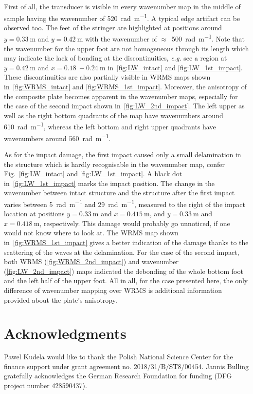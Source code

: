 \documentclass[times,final]{elsarticle}
\begin{document}
First of all, the transducer is visible in every wavenumber map in the middle of sample having the wavenumber of \SI{520}{\radian\per\meter}. A typical edge artifact can be observed too. The feet of the stringer are highlighted at positions around $y=\SI{0.33}{\meter}$ and $y=\SI{0.42}{\meter}$ with the wavenumber of $\approx$~\SI{500}{\radian\per\meter}. Note that the wavenumber for the upper foot are not homogeneous through its length which may indicate the lack of bonding at the discontinuities, \textit{e.g.} see a region at $y=\SI{0.42}{\meter}$ and $x=\SI{0.18}{}-\SI{0.24}{\meter}$ in~\autoref{fig:LW_intact} and \ref{fig:LW_1st_impact}. These discontinuities are also partially visible in WRMS maps shown in~\autoref{fig:WRMS_intact} and \ref{fig:WRMS_1st_impact}. Moreover, the anisotropy of the composite plate becomes apparent in the wavenumber maps, especially for the case of the second impact shown in~\autoref{fig:LW_2nd_impact}. The left upper as well as the right bottom quadrants of the map have wavenumbers around \SI{610}{\radian\per\meter}, whereas the left bottom and right upper quadrants have wavenumbers around \SI{560}{\radian\per\meter}.    

As for the impact damage, the first impact caused only a small delamination in the structure which is hardly recognisable in the wavenumber map, confer Fig.~\autoref{fig:LW_intact} and \ref{fig:LW_1st_impact}. A black dot in~\autoref{fig:LW_1st_impact} marks the impact position. The change in the wavenumber between intact structure and the structure after the first impact varies between \SI{5}{\radian\per\meter} and \SI{29}{\radian\per\meter}, measured to the right of the impact location at positions $y=\SI{0.33}{\meter}$ and $x=\SI{0.415}{\meter}$, and $y=\SI{0.33}{\meter}$ and $x=\SI{0.418}{\meter}$, respectively. This damage would probably go unnoticed, if one would not know where to look at. The WRMS map shown in~\autoref{fig:WRMS_1st_impact} gives a better indication of the damage thanks to the scattering of the waves at the delamination.
For the case of the second impact, both WRMS (\autoref{fig:WRMS_2nd_impact}) and wavenumber (\autoref{fig:LW_2nd_impact}) maps indicated the debonding of the whole bottom foot and the left half of the upper foot. All in all, for the case presented here, the only difference of wavenumber mapping over WRMS is additional information provided about the plate's anisotropy. 

\clearpage

\section*{Acknowledgments}
Pawel Kudela would like to thank the Polish National Science Center for the finance support under grant agreement no. 2018/31/B/ST8/00454. Jannis Bulling gratefully acknowledges the German Research Foundation for funding (DFG project number 428590437).
\end{document}
